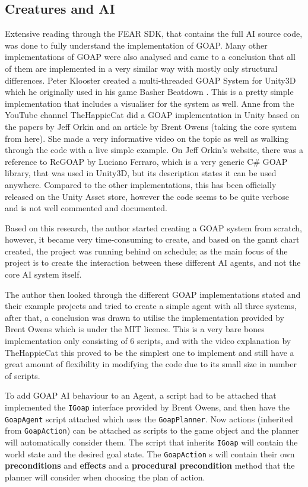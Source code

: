 \documentclass[11pt]{report}
\begin{document}
\subsection{Creatures and AI}
Extensive reading through the FEAR SDK\cite{fearSDK}, that contains the full AI source code, was done to fully understand the implementation of GOAP.
Many other implementations of GOAP were also analysed and came to a conclusion that all of them are implemented in a very similar way with mostly only structural differences. 
Peter Klooster created a multi-threaded GOAP System for Unity3D which he originally used in his game Basher Beatdown \cite{basherGoap}. This is a pretty simple implementation that includes a visualiser for the system as well.
Anne from the YouTube channel TheHappieCat did a GOAP implementation in Unity \cite{happieGoapVideo} based on the papers by Jeff Orkin and an article by Brent Owens \cite{brentOwensGoap} (taking the core system from here). She made a very informative video on the topic as well as walking through the code with a live simple example.
On Jeff Orkin's website, there was a reference to ReGOAP by Luciano Ferraro, which is a very generic C\# GOAP library, that was used in Unity3D, but its description states it can be used anywhere. Compared to the other implementations, this has been officially released on the Unity Asset store, however the code seems to be quite verbose and is not well commented and documented.

Based on this research, the author started creating a GOAP system from scratch, however, it became very time-consuming to create, and based on the gannt chart created, the project was running behind on schedule; as the main focus of the project is to create the interaction between these different AI agents, and not the core AI system itself.

The author then looked through the different GOAP implementations stated and their example projects and tried to create a simple agent with all three systems, after that, a conclusion was drawn to utilise the implementation provided by Brent Owens \cite{brentOwensGoapCode} which is under the MIT licence. This is a very bare bones implementation only consisting of 6 scripts, and with the video explanation by TheHappieCat this proved to be the simplest one to implement and still have a great amount of flexibility in modifying the code due to its small size in number of scripts.

To add GOAP AI behaviour to an Agent, a script had to be attached that implemented the \lstinline{IGoap} interface provided by Brent Owens, and then have the \lstinline{GoapAgent} script attached which uses the \lstinline{GoapPlanner}. Now actions (inherited from \lstinline{GoapAction}) can be attached as scripts to the game object and the planner will automatically consider them. The script that inherits \lstinline{IGoap} will contain the world state and the desired goal state. The \lstinline{GoapAction} s will contain their own \textbf{preconditions} and \textbf{effects} and a \textbf{procedural precondition} method that the planner will consider when choosing the plan of action. 
\end{document}
